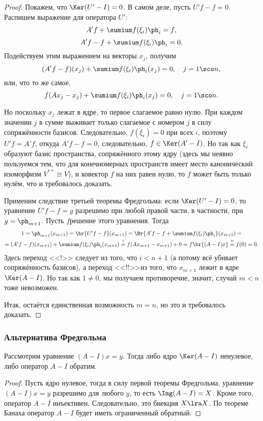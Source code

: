 \documentclass[a4paper]{article}
\begin{document}
\begin{proof}
Покажем, что $\Ker(U' - I) = 0$. В самом деле, пусть $U'f - f = 0$.
Распишем выражение для оператора $U'$:
$$A'f + \sumium f(\xi_i)\ph_i = f,$$
$$A'f - f + \sumium f(\xi_i)\ph_i = 0.$$
Подействуем этим выражением на векторы $x_j$, получим
$$(A'f-f)(x_j) + \sumium f(\xi_i)\ph_i(x_j) = 0, \quad j =1\sco n,$$
или, что то же самое,
$$f(Ax_j-x_j) + \sumium f(\xi_i)\ph_i(x_j) = 0, \quad j =1\sco n.$$

Но поскольку $x_j$ лежат в ядре, то первое слагаемое равно нулю. При каждом значении $j$ в сумме
выживает только слагаемое с номером $j$ в силу сопряжённости базисов.
Следовательно, $f(\xi_i) = 0$ при всех $i$, поэтому $U'f = A'f$, откуда $A'f - f = 0$, следовательно,
$f \in \Ker(A'-I)$. Но так как $\xi_i$ образуют базис пространства, сопряжённого этому ядру
(здесь мы неявно пользуемся тем, что для конечномерных пространств имеет место
канонический изоморфизм $V^{**} \cong V$),
и ковектор $f$ на них равен нулю, то $f$ может быть только нулём, что и требовалось доказать.

Применим следствие третьей теоремы Фредгольма: если $\Ker(U' - I) = 0$, то уравнение
$U'f - f = g$ разрешимо при любой правой части, в частности, при $g = \ph_{m+1}$.
Пусть $f$\т решение этого уравнения. Тогда
\begin{multline*}
1 = \ph_{m+1}(x_{m+1}) = \hr{U'f - f}(x_{m+1}) = \Br{A'f - f + \sumium f(\xi_i)\ph_i}(x_{m+1}) =\\=
(A'f-f)(x_{m+1}) + \sumium f(\xi_i)\ph_i(x_{m+1}) \stackrel{!}{=}
f(Ax_{m+1} - x_{m+1}) + 0 = f\br{(A-I)x} \stackrel{!!}{=} f(0) = 0.
\end{multline*}
Здесь переход <<!>> следует из того, что $i < n+1$ (а потому всё убивает сопряжённость базисов),
а переход <<!!>>\т из того, что $x_{m+1}$ лежит в ядре $\Ker(A-I)$.
Но так как $1 \neq 0$, мы получаем противоречие, значит, случай $m < n$ тоже невозможен.

Итак, остаётся единственная возможность $m=n$, но это и требовалось доказать.
\end{proof}


\subsubsection{Альтернатива Фредгольма}

\begin{theorem}
Рассмотрим уравнение $(A-I)x = y$. Тогда либо ядро
$\Ker(A-I)$ ненулевое, либо оператор $A - I$ обратим.
\end{theorem}
\begin{proof}
Пусть ядро нулевое, тогда в силу первой теоремы Фредгольма,
уравнение $(A-I)x = y$ разрешимо для любого $y$, то есть $\Img(A-I) = X$.
Кроме того, оператор $A - I$ инъективен. Следовательно, это биекция $X \lra X$.
По теореме Банаха оператор $A - I$ будет иметь ограниченный обратный.
\end{proof}
\end{document}
